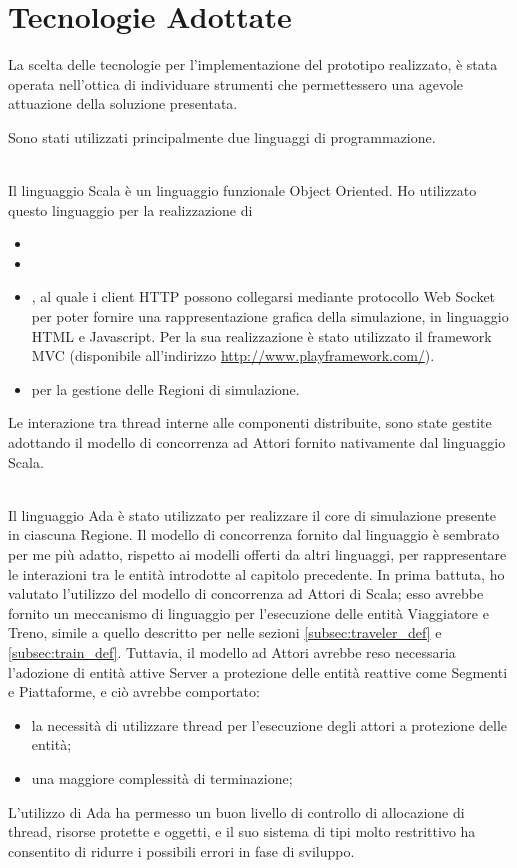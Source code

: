 \chapter{Tecnologie Adottate}

La scelta delle tecnologie per l'implementazione del prototipo realizzato, è stata operata nell'ottica di individuare strumenti che permettessero una agevole attuazione della soluzione presentata.

Sono stati utilizzati principalmente due linguaggi di programmazione.
	\begin{description}
		\item {} \\
		Il linguaggio Scala è un linguaggio funzionale Object Oriented. Ho utilizzato questo linguaggio per la realizzazione di 
			\begin{itemize}
				\item {}
				\item {}
				\item {}, al quale i client HTTP possono collegarsi mediante protocollo Web Socket per poter fornire una rappresentazione grafica della simulazione, in linguaggio HTML e Javascript. Per la sua realizzazione è stato utilizzato il framework MVC  (disponibile all'indirizzo \url{http://www.playframework.com/}).
				\item {} per la gestione delle Regioni di simulazione.
			\end{itemize}
		Le interazione tra thread interne alle componenti distribuite, sono state gestite adottando il modello di concorrenza ad Attori fornito nativamente dal linguaggio Scala. 
		\item {} \\
		Il linguaggio Ada è stato utilizzato per realizzare il core di simulazione presente in ciascuna Regione. Il modello di concorrenza fornito dal linguaggio è sembrato per me più adatto, rispetto ai modelli offerti da altri linguaggi, per rappresentare le interazioni tra le entità introdotte al capitolo precedente. 
		In prima battuta, ho valutato l'utilizzo del modello di concorrenza ad Attori di Scala; esso avrebbe fornito un meccanismo di linguaggio per l'esecuzione delle entità Viaggiatore e Treno, simile a quello descritto per nelle sezioni \ref{subsec:traveler_def} e \ref{subsec:train_def}. Tuttavia, il modello ad Attori avrebbe reso necessaria l'adozione di entità attive Server a protezione delle entità reattive come Segmenti e Piattaforme, e ciò avrebbe comportato:
			\begin{itemize}
				\item la necessità di utilizzare thread per l'esecuzione degli attori a protezione delle entità;
				\item una maggiore complessità di terminazione;
			\end{itemize}
		L'utilizzo di Ada ha permesso un buon livello di controllo di allocazione di thread, risorse protette e oggetti, e il suo sistema di tipi molto restrittivo ha consentito di ridurre i possibili errori in fase di sviluppo.
		  
	\end{description}
	
